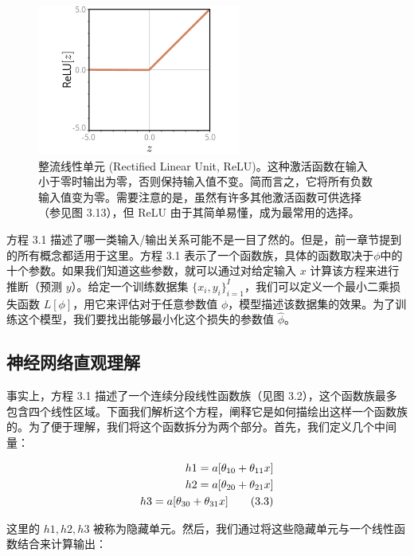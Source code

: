 \begin{figure}[ht!]
	\centering
	\includegraphics[width=0.7\linewidth]{png/chapter3/ShallowReLU.png}
\caption{整流线性单元 (Rectified Linear Unit, ReLU)。这种激活函数在输入小于零时输出为零，否则保持输入值不变。简而言之，它将所有负数输入值变为零。需要注意的是，虽然有许多其他激活函数可供选择（参见图 3.13），但 ReLU 由于其简单易懂，成为最常用的选择。}
\end{figure}

方程 3.1 描述了哪一类输入/输出关系可能不是一目了然的。但是，前一章节提到的所有概念都适用于这里。方程 3.1 表示了一个函数族，具体的函数取决于\(\phi\)中的十个参数。如果我们知道这些参数，就可以通过对给定输入 \(x\) 计算该方程来进行推断（预测 \(y\)）。给定一个训练数据集 \(\{{x_i,y_i}\}^I_{i=1}\)，我们可以定义一个最小二乘损失函数 \(L[\phi]\)，用它来评估对于任意参数值 \(\phi\)，模型描述该数据集的效果。为了训练这个模型，我们要找出能够最小化这个损失的参数值 \(\hat \phi\)。


\subsection{神经网络直观理解}
事实上，方程 3.1 描述了一个连续分段线性函数族（见图 3.2），这个函数族最多包含四个线性区域。下面我们解析这个方程，阐释它是如何描绘出这样一个函数族的。为了便于理解，我们将这个函数拆分为两个部分。首先，我们定义几个中间量：


\begin{align}
	h1 = a[\theta_{10} + \theta_{11}x] \notag \\
	h2 = a[\theta_{20} + \theta_{21}x] \notag \\
	h3 = a[\theta_{30} + \theta_{31}x]  \tag{3.3}
\end{align} 

这里的 \(h1, h2, h3\) 被称为隐藏单元。然后，我们通过将这些隐藏单元与一个线性函数结合来计算输出：

